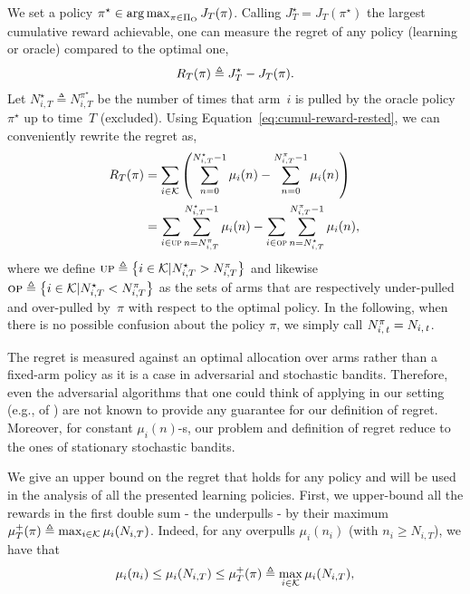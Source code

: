 We set a policy $\pi^\star\in \operatorname*{arg\,max}_{\pi \in \Pi_{\rm O}} J_T(\pi)$. Calling $J_T^\star = J_T(\pi^\star)$ the largest cumulative reward achievable, one can measure the regret of any policy (learning or oracle) compared to the optimal one, 
\begin{align}\label{eq:regret}
R_T(\pi) \triangleq J^\star_T - J_T(\pi).
\end{align}
%
Let $N_{i,T}^\star \triangleq N_{i,T}^{\pi^\star}$ be the number of times that arm~$i$ is pulled by the oracle policy $\pi^\star$ up to time~$T$ (excluded).  Using Equation~\ref{eq:cumul-reward-rested},  we can conveniently rewrite the regret as,
%
\begin{align}
\!R_T(\pi) &= \sum_{i\in\mathcal{K}}\left( \sum_{n=0}^{N_{i,T}^\star-1}  \mu_{i}(n)  - \sum_{n=0}^{N_{i,T}^\pi-1}  \mu_{i}(n) \right) \nonumber\\ 
& = \sum_{i \in \textsc{up}}\sum_{n=N_{i, T}^{\pi}}^{N_{i, T}^{\star}-1} \mu_i(n) - \sum_{i \in \textsc{op}} \sum_{n=N_{i, T}^{\star}}^{N_{i, T}^{\pi}-1} \mu_i(n),\label{eq:regret2}
\end{align}
%
where we define $\textsc{up} \triangleq \left\{ i \in \mathcal{K} | N_{i, T}^{\star} > N_{i, T}^{\pi} \right\}$ and likewise $\textsc{op} \triangleq \left\{ i\in \mathcal{K} | N_{i, T}^{\star} < N_{i, T}^{\pi}\right\}$ as the sets of arms that are respectively under-pulled and over-pulled by~$\pi$ with respect to the optimal policy. In the following, when there is no possible confusion about the policy $\pi$, we simply call $N_{i,\,t}^\pi = N_{i,\,t}$.
%
\begin{remark}
The regret is measured against an optimal allocation over arms rather than a fixed-arm policy as it is a case in adversarial and stochastic bandits. Therefore, even the adversarial algorithms that one could think of applying in our setting (e.g., \EXP of \citet{auer2002finite}) are not known to provide any guarantee for our definition of regret. Moreover, for constant $\mu_i(n)$-s, our problem and definition of regret reduce to the ones of stationary stochastic bandits. 
\end{remark}
%
We give an upper bound on the regret that holds for any policy and will be used in the analysis of all the presented learning policies. First, we upper-bound all the rewards in the first double sum - the underpulls - by their maximum $\mu^+_T(\pi) \triangleq \max_{i\in\mathcal{K}} \mu_i(N_{i,T})$. Indeed, for any overpulls $\mu_i(n_i) $ (with  $n_i \geq N_{i,T}$), we have that
\[
\mu_i(n_i) \leq \mu_i(N_{i,T}) \leq \mu^+_T(\pi)  \triangleq \max_{i\in\mathcal{K}} \mu_i(N_{i,T}),
\]
